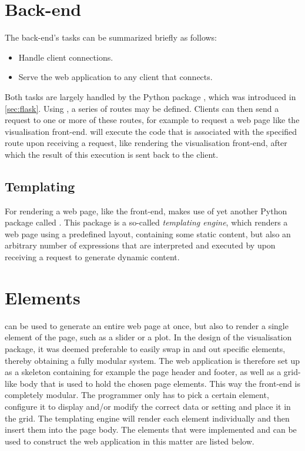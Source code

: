 \documentclass[a4paper, openany, oneside]{memoir}
\begin{document}
\section{Back-end}
\label{sec:webserver}
The back-end's tasks can be summarized briefly as follows:

\begin{itemize}
	\item Handle client connections.
	\item Serve the web application to any client that connects.
\end{itemize}

Both tasks are largely handled by the Python package , which was introduced in \cref{sec:flask}. Using , a series of routes may be defined. Clients can then send a request to one or more of these routes, for example to request a web page like the visualisation front-end.  will execute the code that is associated with the specified route upon receiving a request, like rendering the visualisation front-end, after which the result of this execution is sent back to the client.

\subsection{Templating}
\label{sec:templating}
For rendering a web page, like the front-end,  makes use of yet another Python package called . This package is a so-called \emph{templating engine}, which renders a web page using a predefined layout, containing some static content, but also an arbitrary number of expressions that are interpreted and executed by  upon receiving a request to generate dynamic content.

\section{Elements}
\label{sec:elements}
 can be used to generate an entire web page at once, but also to render a single element of the page, such as a slider or a plot. In the design of the visualisation package, it was deemed preferable to easily swap in and out specific elements, thereby obtaining a fully modular system. The web application is therefore set up as a skeleton containing for example the page header and footer, as well as a grid-like body that is used to hold the chosen page elements. This way the front-end is completely modular. The programmer only has to pick a certain element, configure it to display and/or modify the correct data or setting and place it in the grid. The templating engine will render each element individually and then insert them into the page body. The elements that were implemented and can be used to construct the web application in this matter are listed below.
\end{document}
